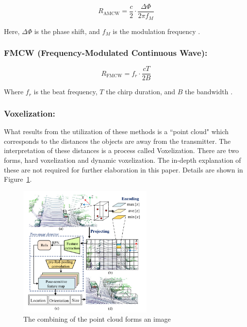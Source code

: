 \documentclass[12pt]{article}
\begin{document}
\begin{equation}
R_{\text{AMCW}} = \frac{c}{2} \cdot \frac{\Delta\Phi}{2\pi f_M}
\label{eq:amcw}
\end{equation}

Here, \( \Delta\Phi \) is the phase shift, and \( f_M \) is the modulation frequency \cite{2019Royo}.

\subsubsection{FMCW (Frequency-Modulated Continuous Wave):}

\begin{equation}
R_{\text{FMCW}} = f_r \cdot \frac{c T}{2B}
\label{eq:fmcw}
\end{equation}

Where \( f_r \) is the beat frequency, \( T \) the chirp duration, and \( B \) the bandwidth \cite{2019Royo}.

\subsubsection{Voxelization:}
What results from the utilization of these methods is a ``point cloud" which
corresponds to the distances the objects are away from the transmitter. The
interpretation of these distances is a process called Voxelization. There are
two forms, hard voxelization and dynamic voxelization. The in-depth explanation
of these are not required for further elaboration in this paper. Details are
shown in Figure~\ref{fig:voxelization}.
\begin{figure}[H]
	\centering
	\includegraphics[width=0.6\textwidth]{voxelization.png}
	\caption{The combining of the point cloud forms an image \autocite{RT3D}}
	\label{fig:voxelization}
\end{figure}
\end{document}
